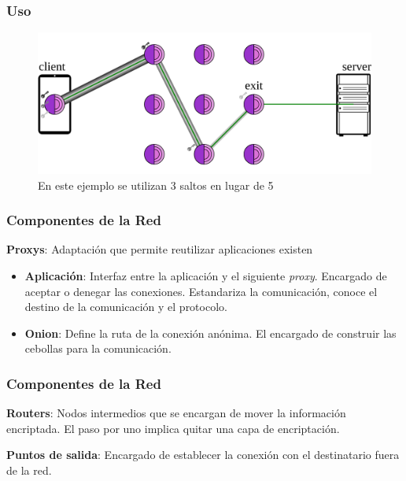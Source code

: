 \documentclass{beamer}
\newcommand{\vspc}{\vspace{0.5cm}}
\begin{document}
\begin{frame}
    \frametitle{Uso}

    \begin{figure}[h]
        \centering
        \includegraphics[scale=0.3]{circuitDiagram.png}
        \caption{En este ejemplo se utilizan 3 saltos en lugar de 5}
    \end{figure}
    
\end{frame}

\begin{frame}
    \frametitle{Componentes de la Red}
    \textbf{Proxys}: Adaptación que permite reutilizar aplicaciones existen
    \begin{itemize}
        \item \textbf{Aplicación}: Interfaz entre la aplicación y el siguiente \textit{proxy}. Encargado de aceptar o denegar las conexiones. Estandariza la comunicación, conoce el destino de la comunicación y el protocolo.
        \item \textbf{Onion}: Define la ruta de la conexión anónima. El encargado de construir las cebollas para la comunicación.
    \end{itemize}
    
    
\end{frame}

\begin{frame}
    \frametitle{Componentes de la Red}
    \textbf{Routers}: Nodos intermedios que se encargan de mover la información encriptada. El paso por uno implica quitar una capa de encriptación.
    
    \vspc

    \textbf{Puntos de salida}: Encargado de establecer la conexión con el destinatario fuera de la red. 

\end{frame}
\end{document}

